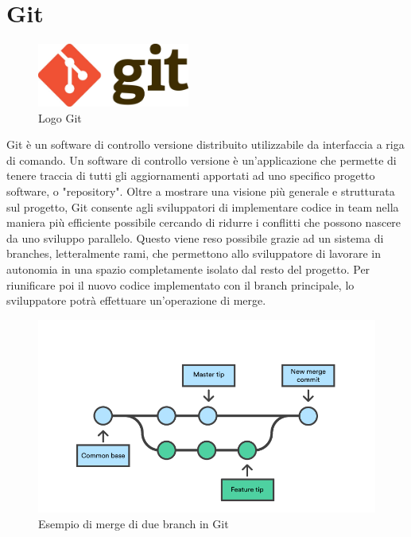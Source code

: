 \section{Git}
\begin{figure}[ht!]
\begin{center}
  \includegraphics[width=5cm]{images/git_logo.jpg}
  \caption{Logo Git}
\end{center}
\end{figure}
Git è un software di controllo versione distribuito utilizzabile da interfaccia a riga di comando. \cite{GIT}
Un software di controllo versione è un'applicazione che permette di tenere traccia di tutti gli aggiornamenti apportati ad uno specifico progetto software, o "repository".
Oltre a mostrare una visione più generale e strutturata sul progetto, Git consente agli sviluppatori di implementare codice in team nella maniera più efficiente possibile cercando di ridurre i conflitti che possono nascere da uno sviluppo parallelo. Questo viene reso possibile grazie ad un sistema di branches, letteralmente rami, che permettono allo sviluppatore di lavorare in autonomia in una spazio completamente isolato dal resto del progetto. Per riunificare poi il nuovo codice implementato con il branch principale, lo sviluppatore potrà effettuare un'operazione di merge.
\begin{figure}[ht!]
\begin{center}
  \includegraphics[width=12cm]{images/merge-di-due-branch.png}
  \caption{Esempio di merge di due branch in Git}
\end{center}
\end{figure}

